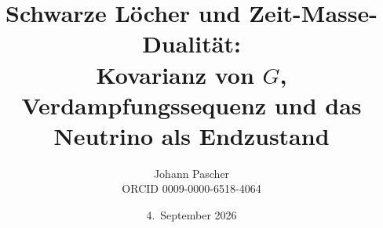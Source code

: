 \documentclass[11pt,a4paper]{report}
\title{Schwarze Löcher und Zeit-Masse-Dualität:\\[0.5em]
  \large Kovarianz von $G$, Verdampfungssequenz und das Neutrino als Endzustand}
\date{4.~September 2026}
\author{Johann Pascher\\\small ORCID 0009-0000-6518-4064}
\begin{document}
\renewcommand{\thechapter}{}
\renewcommand{\thesection}{\arabic{section}}
\maketitle
\tableofcontents

\end{document}

